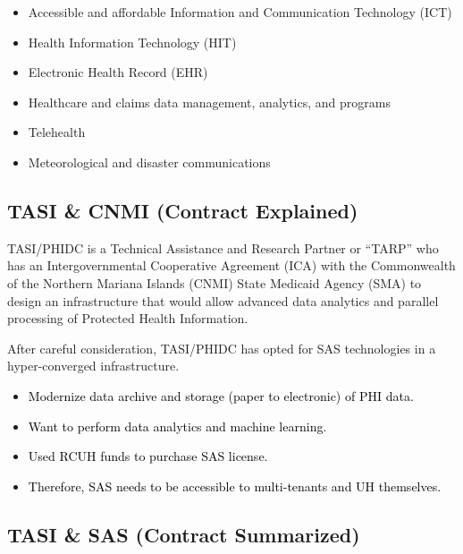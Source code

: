 \begin{itemize}
    \item Accessible and affordable Information and Communication Technology (ICT)
    \item Health Information Technology (HIT)
    \item Electronic Health Record (EHR)
    \item Healthcare and claims data management, analytics, and programs
    \item Telehealth
    \item Meteorological and disaster communications
\end{itemize}

\subsection{TASI \& CNMI (Contract Explained)}
TASI/PHIDC is a Technical Assistance and Research Partner or “TARP” who has an Intergovernmental Cooperative Agreement (ICA) with the Commonwealth of the Northern Mariana Islands (CNMI) State Medicaid Agency (SMA) to design an infrastructure that would allow advanced data analytics and parallel processing of Protected Health Information. 

After careful consideration, TASI/PHIDC has opted for SAS technologies in a hyper-converged infrastructure.

\begin{itemize}
    \item \textcolor{black}{Modernize data archive and storage (paper to electronic) of PHI data.}
    \item \textcolor{black}{Want to perform data analytics and machine learning.}
    \item \textcolor{black}{Used RCUH funds to purchase SAS license.}
    \item \textcolor{black}{Therefore, SAS needs to be accessible to multi-tenants and UH themselves.}
\end{itemize}

\newpage

\subsection{TASI \& SAS (Contract Summarized)}


